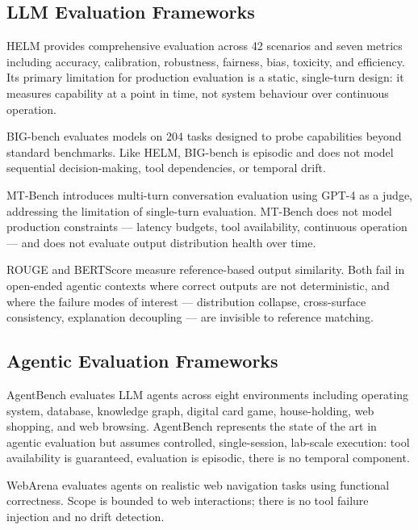 \documentclass{article}
\begin{document}
\subsection{LLM Evaluation Frameworks}

HELM \citep{liang2022helm} provides comprehensive evaluation across 42
scenarios and seven metrics including accuracy, calibration, robustness,
fairness, bias, toxicity, and efficiency.  Its primary limitation for
production evaluation is a static, single-turn design: it measures capability
at a point in time, not system behaviour over continuous operation.

BIG-bench \citep{srivastava2022bigbench} evaluates models on 204 tasks
designed to probe capabilities beyond standard benchmarks.  Like HELM,
BIG-bench is episodic and does not model sequential decision-making, tool
dependencies, or temporal drift.

MT-Bench \citep{zheng2023mtbench} introduces multi-turn conversation evaluation
using GPT-4 as a judge, addressing the limitation of single-turn evaluation.
MT-Bench does not model production constraints --- latency budgets, tool
availability, continuous operation --- and does not evaluate output distribution
health over time.

ROUGE \citep{lin2004rouge} and BERTScore \citep{zhang2019bertscore} measure
reference-based output similarity.  Both fail in open-ended agentic contexts
where correct outputs are not deterministic, and where the failure modes of
interest --- distribution collapse, cross-surface consistency, explanation
decoupling --- are invisible to reference matching.

\subsection{Agentic Evaluation Frameworks}

AgentBench \citep{liu2023agentbench} evaluates LLM agents across eight
environments including operating system, database, knowledge graph, digital
card game, house-holding, web shopping, and web browsing.  AgentBench
represents the state of the art in agentic evaluation but assumes controlled,
single-session, lab-scale execution: tool availability is guaranteed, evaluation
is episodic, there is no temporal component.

WebArena \citep{zhou2023webarena} evaluates agents on realistic web navigation
tasks using functional correctness.  Scope is bounded to web interactions;
there is no tool failure injection and no drift detection.
\end{document}
